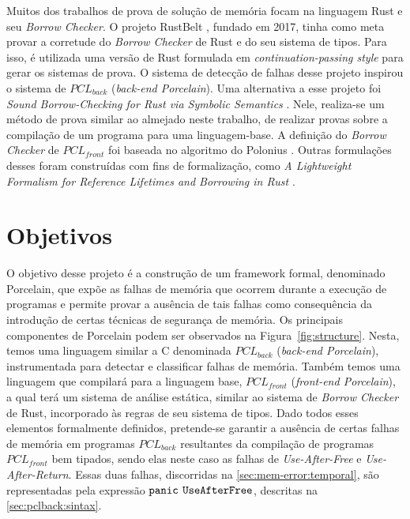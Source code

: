 Muitos dos trabalhos de prova de solução de memória focam na linguagem Rust e seu \emph{Borrow Checker}. O projeto RustBelt \cite{RUSTBELT}, fundado em 2017, tinha como meta provar a corretude do \emph{Borrow Checker} de Rust e do seu sistema de tipos. Para isso, é utilizada uma versão de Rust formulada em \emph{continuation-passing style} para gerar os sistemas de prova. O sistema de detecção de falhas desse projeto inspirou o sistema de $PCL_{back}$ (\emph{back-end Porcelain}). Uma alternativa a esse projeto foi \emph{Sound Borrow-Checking for Rust via Symbolic Semantics} \cite{RUSTSYMBOLIC}. Nele, realiza-se um método de prova similar ao almejado neste trabalho, de realizar provas sobre a compilação de um programa para uma linguagem-base. A definição do \emph{Borrow Checker} de $PCL_{front}$ foi baseada no algoritmo do Polonius \cite{Stjerna1684081}.  Outras formulações desses foram construídas com fins de formalização, como \emph{A Lightweight Formalism for Reference Lifetimes and Borrowing in Rust} \cite{RUSTFORMALISM}. 


\section{Objetivos}

O objetivo desse projeto é a construção de um framework formal, denominado Porcelain, que expõe as falhas de memória que ocorrem durante a execução de programas e permite provar a ausência de tais falhas como consequência da introdução de certas técnicas de segurança de memória. Os principais componentes de Porcelain podem ser observados na Figura~\ref{fig:structure}. Nesta, temos uma linguagem similar a C denominada $PCL_{back}$ (\emph{back-end Porcelain}), instrumentada para detectar e classificar falhas de memória. Também temos uma linguagem que compilará para a linguagem base, $PCL_{front}$ (\emph{front-end Porcelain}), a qual terá um sistema de análise estática, similar ao sistema de \emph{Borrow Checker} de Rust, incorporado às regras de seu sistema de tipos. Dado todos esses elementos formalmente definidos, pretende-se garantir a ausência de certas falhas de memória em programas $PCL_{back}$ resultantes da compilação de programas $PCL_{front}$ bem tipados, sendo elas neste caso as falhas de \emph{Use-After-Free} e \emph{Use-After-Return}. Essas duas falhas, discorridas na \autoref{sec:mem-error:temporal}, são representadas pela expressão $\texttt{panic}$ $\texttt{UseAfterFree}$, descritas na \autoref{sec:pclback:sintax}.

